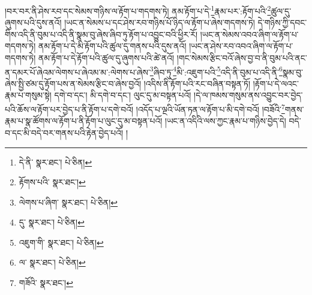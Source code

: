 །བར་བར་ནི་ཤེས་རབ་དང་སེམས་གཉིས་ལ་རྟོག་པ་གདགས་ཏེ། ནམ་རྟོག་པ་དེ་\footnote{དེ་ནི་  སྣར་ཐང་།  པེ་ཅིན། }རྣམ་པར་:རྟོག་པའི་\footnote{རྟོགས་པའི་  སྣར་ཐང་། }ཚུལ་དུ་ཞུགས་པའི་དུས་ནའོ། །ཡང་ན་སེམས་པ་དང་ཤེས་རབ་གཉིས་པོ་ཉིད་ལ་རྟོག་པ་ཞེས་གདགས་ཏེ། དེ་གཉིས་ཀྱི་དབང་གིས་འདི་ནི་བུམ་པ་འདི་ནི་སྣམ་བུ་ཞེས་ཞིབ་ཏུ་རྟོག་པ་འབྱུང་བའི་ཕྱིར་རོ། །ཡང་ན་སེམས་འབའ་ཞིག་ལ་རྟོག་པ་གདགས་ཏེ། ནམ་རྟོག་པ་དེ་མི་རྟོག་པའི་ཚུལ་དུ་གནས་པའི་དུས་ནའོ། །ཡང་ན་ཤེས་རབ་འབའ་ཞིག་ལ་རྟོག་པ་གདགས་ཏེ། ནམ་རྟོག་པ་དེ་རྟོག་པའི་ཚུལ་དུ་ཞུགས་པའི་ཚེ་ནའོ། །གང་སེམས་རྩིང་བའོ་ཞེས་བྱ་བ་ནི་བུམ་པའི་ནང་ན་དམར་པོ་ཞེའམ་ལེགས་པ་ཞེའམ་མ་:ལེགས་པ་ཞེས་\footnote{ལེགས་པ་ཞིག་  སྣར་ཐང་།  པེ་ཅིན། }ཞིབ་ཏུ་\footnote{དུ་  སྣར་ཐང་།  པེ་ཅིན། }མི་:འཇུག་པའི་\footnote{འཇུག་གི་  སྣར་ཐང་།  པེ་ཅིན། }འདི་ནི་བུམ་པ་འདི་ནི་\footnote{ལ་  སྣར་ཐང་།  པེ་ཅིན། }སྣམ་བུ་ཞེས་སྤྱི་ཙམ་དུ་རྟོག་པས་ན་སེམས་རྩིང་བ་ཞེས་བྱའོ། །འདིས་ནི་རྟོག་པའི་རང་བཞིན་བསྟན་ཏོ། །རྟོག་པ་དེ་ལའང་རྣམ་པ་གསུམ་སྟེ། དགེ་བ་དང་། མི་དགེ་བ་དང་། ལུང་དུ་མ་བསྟན་པའོ། །དེ་ལ་ཁམས་གསུམ་ནས་འབྱུང་བར་བྱེད་པའི་ཆོས་ལ་རྟོག་པར་བྱེད་པ་ནི་རྟོག་པ་དགེ་བའོ། །འདོད་པ་ལྔའི་ཡོན་ཏན་ལ་རྟོག་པ་མི་དགེ་བའོ། །བཟོའི་\footnote{གཟོའི་  སྣར་ཐང་། }གནས་རྣམ་པ་སྣ་ཚོགས་ལ་རྟོག་པ་ནི་རྟོག་པ་ལུང་དུ་མ་བསྟན་པའོ། །ཡང་ན་འདིའི་ལས་ཀྱང་རྣམ་པ་གཉིས་བྱེད་དེ། བདེ་བ་དང་མི་བདེ་བར་གནས་པའི་རྟེན་བྱེད་པའོ། །
